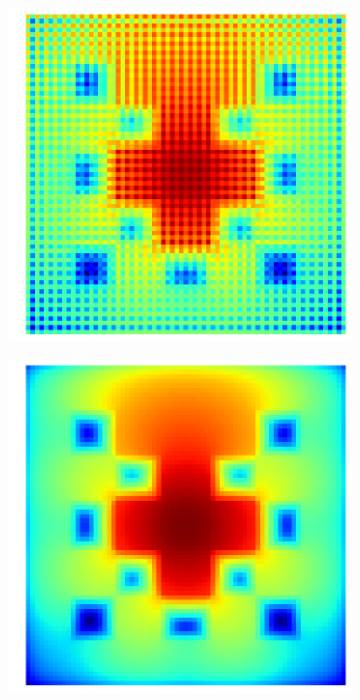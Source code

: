 \begin{figure}[h]
\centering
\begin{subfigure}{0.45\columnwidth}
\includegraphics[width=\columnwidth]{images/checkerboard2d_p1_collocated.png}
\end{subfigure}%
\hspace{0.05\columnwidth}
\begin{subfigure}{0.45\columnwidth}
\includegraphics[width=\columnwidth]{images/checkerboard2d_p1_staggered.png}

\end{subfigure}
\end{figure}
